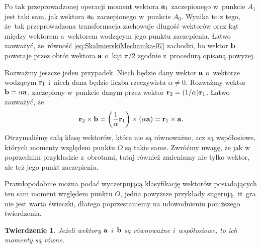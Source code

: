 \documentclass[a4paper,11pt]{article}
\newtheorem{theorem}{Twierdzenie}  %
\begin{document}
Po tak przeprowadzonej operacji moment wektora $\mathbf{a}_{ 1 }$
zaczepionego w~punkcie $A_{ 1 }$ jest taki sam, jak wektora $\mathbf{a}_{ 0 }$
zaczepionego w~punkcie $A_{ 0 }$. Wynika to z tego, że~tak przeprowadzona
transformacja zachowuje długość wektorów oraz kąt między wektorem
a~wektorem wodzącym jego punktu zaczepienia. Łatwo zauważyć, że~równość
\eqref{eq:SkalmierskiMechanika-07} zachodzi, bo wektor $\mathbf{b}$ powstaje
przez obrót wektora $\mathbf{a}$ o~kąt $\pi / 2$ zgodnie z~procedurą opisaną
powyżej.

Rozważmy jeszcze jeden przypadek. Niech będzie dany wektor $\mathbf{a}$
o~wektorze wodzącym $\mathbf{r}_{ 1 }$ i~niech dana będzie liczba rzeczywista
$\alpha \neq 0$. Rozważmy wektor $\mathbf{b} = \alpha \mathbf{a}$, zaczepiony w~punkcie
danym przez wektor $\mathbf{r}_{ 2 } = ( 1 / \alpha ) \mathbf{r}_{ 1 }$. Łatwo
zauważyć, że
\begin{equation}
  \label{eq:SkalmierskiMechanika-08}
  \mathbf{r}_{ 2 } \times \mathbf{b} =
  \left( \frac{ 1 }{ \alpha } \mathbf{r}_{ 1 } \right) \times ( \alpha \mathbf{a} ) =
  \mathbf{r}_{ 1 } \times \mathbf{a}.
\end{equation}
Otrzymaliśmy całą klasę wektorów, które nie są równoważne, acz są
współosiowe, których momenty względem punktu $O$ są takie same. Zwróćmy
uwagę, że jak w poprzednim przykładzie z~obrotami, tutaj również zmieniamy
nie tylko wektor, ale też jego punkt zaczepienia.

Prawdopodobnie można podać wyczerpującą klasyfikację wektorów posiadających
ten sam moment względem punktu $O$, jedna powyższe przykłady sugerują,
iż~gra nie jest warta świeczki, dlatego poprzestaniemy na udowodnieniu
poniższego twierdzenia.





\begin{theorem}

  Jeżeli wektory $\mathbf{a}$ i~$\mathbf{b}$ są równoważne i~współosiowe, to
  ich momenty są równe.

\end{theorem}
\end{document}

